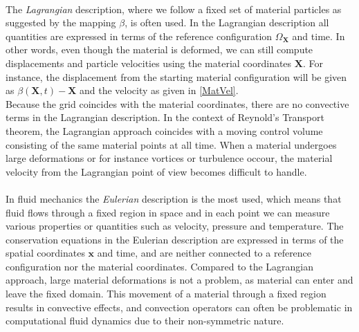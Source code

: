 \\
The \textit{Lagrangian} description, where we follow a fixed set of material particles as suggested by the mapping $\beta$, is often used. In the Lagrangian description all quantities are expressed in terms of the reference configuration $\Omega_{\mathbf{X}}$ and time. In other words, even though the material is deformed, we can still compute displacements and particle velocities using the material coordinates $\mathbf{X}$. For instance, the displacement from the starting material configuration will be given as $\beta(\mathbf{X},t) - \mathbf{X}$ and the velocity as given in \eqref{MatVel}. \\ Because the grid coincides with the material coordinates, there are no convective terms in the Lagrangian description. In the context of Reynold's Transport theorem, the Lagrangian approach coincides with a moving control volume consisting of the same material points at all time. When a material undergoes large deformations or for instance vortices or turbulence occour, the material velocity from the Lagrangian point of view becomes difficult to handle. 
\\
\\
In fluid mechanics the \textit{Eulerian} description is the most used, which means that fluid flows through a fixed region in space and in each point we can measure various properties or quantities such as velocity, pressure and temperature. The conservation equations in the Eulerian description are expressed in terms of the spatial coordinates $\mathbf{x}$ and time, and are neither connected to a reference configuration nor the material coordinates. Compared to the Lagrangian approach, large material deformations is not a problem, as material can enter and leave the fixed domain. This movement of a material through a fixed region results in convective effects, and convection operators can often be problematic in computational fluid dynamics due to their non-symmetric nature. 
\\
\\
